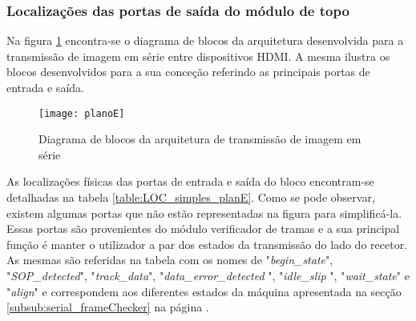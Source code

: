 \subsubsection*{Localizações das portas de saída do módulo de topo} \label{subsub:serial_locs_planE}

Na figura \ref{fig:planoE} encontra-se o diagrama de blocos da arquitetura desenvolvida para a transmissão de imagem em série entre dispositivos HDMI. A mesma ilustra os blocos desenvolvidos para a sua conceção referindo as principais portas de entrada e saída.

\begin{figure}[h!]
	\begin{center}
		\leavevmode
		\texttt{[image: planoE]}
		\captionsetup{width=1.0\linewidth}
		\caption[Diagrama de blocos da arquitetura de transmissão de imagem em série]{Diagrama de blocos da arquitetura de transmissão de imagem em série}
		\label{fig:planoE}
	\end{center}
\end{figure}

As localizações físicas das portas de entrada e saída do bloco encontram-se detalhadas na tabela \ref{table:LOC_simples_planE}. Como se pode observar, existem algumas portas que não estão representadas na figura \label{fig:planE} para simplificá-la. Essas portas são provenientes do módulo verificador de tramas e a sua principal função é manter o utilizador a par dos estados da transmissão do lado do recetor.  As mesmas são referidas na tabela com os nomes de "\textit{begin\_state}", "\textit{SOP\_detected}", "\textit{track\_data}", "\textit{data\_error\_detected }", "\textit{idle\_slip }", "\textit{wait\_state}" e "\textit{align}" e correspondem aos diferentes estados da máquina apresentada na secção \ref{subsub:serial_frameChecker} na página \pageref{subsub:serial_frameChecker}.

